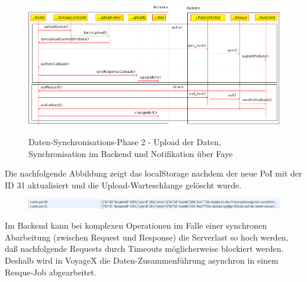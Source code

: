   \begin{figure}[H]
  	\begin{adjustwidth}{-1.5cm}{1.5cm}
      \centering
  	  \includegraphics[scale=0.7]{bilder/uml/syncPoiNoteQueue.png} \\
  	  \caption{Daten-Synchronisations-Phase 2 - Upload der Daten, Synchronisation im Backend und Notifikation über Faye}
  	\end{adjustwidth}
  \end{figure}
\noindent
Die nachfolgende Abbildung zeigt das localStorage nachdem der neue PoI mit der ID 31 aktualisiert und die Upload-Warteschlange gelöscht wurde.
  \begin{figure}[H]
  	\begin{adjustwidth}{-0.8cm}{0.8cm}
      \centering
  	  \includegraphics[scale=0.7]{bilder/screenshots/queue_localStrorage_2.png}
  	\end{adjustwidth}
  \end{figure}
\noindent
Im Backend kann bei komplexen Operationen im Falle einer synchronen Abarbeitung (zwischen Request und Response) die Serverlast so hoch werden, daß nachfolgende Requests durch Timeouts möglicherweise blockiert werden. Deshalb wird in VoyageX die Daten-Zusammenführung asynchron in einem Resque-Job abgearbeitet.

